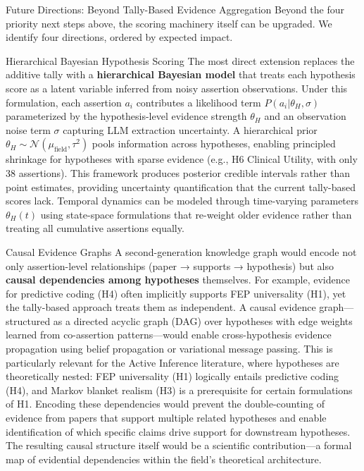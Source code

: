 \documentclass[
  ignorenonframetext,
]{beamer}
\begin{document}
\begin{frame}[allowframebreaks]{Future Directions: Beyond Tally-Based
Evidence Aggregation}
\protect{}\label{future-directions-beyond-tally-based-evidence-aggregation}
Beyond the four priority next steps above, the scoring machinery itself
can be upgraded. We identify four directions, ordered by expected
impact.

\begin{block}{Hierarchical Bayesian Hypothesis Scoring}
\protect{}\label{hierarchical-bayesian-hypothesis-scoring}
The most direct extension replaces the additive tally with a
\textbf{hierarchical Bayesian model} that treats each hypothesis score
as a latent variable inferred from noisy assertion observations. Under
this formulation, each assertion \(a_i\) contributes a likelihood term
\(P(a_i | \theta_H, \sigma)\) parameterized by the hypothesis-level
evidence strength \(\theta_H\) and an observation noise term \(\sigma\)
capturing LLM extraction uncertainty. A hierarchical prior
\(\theta_H \sim \mathcal{N}(\mu_{\text{field}}, \tau^2)\) pools
information across hypotheses, enabling principled shrinkage for
hypotheses with sparse evidence (e.g., H6 Clinical Utility, with only 38
assertions). This framework produces posterior credible intervals rather
than point estimates, providing uncertainty quantification that the
current tally-based scores lack. Temporal dynamics can be modeled
through time-varying parameters \(\theta_H(t)\) using state-space
formulations that re-weight older evidence rather than treating all
cumulative assertions equally.
\end{block}

\begin{block}{Causal Evidence Graphs}
\protect{}\label{causal-evidence-graphs}
A second-generation knowledge graph would encode not only
assertion-level relationships (paper → supports → hypothesis) but also
\textbf{causal dependencies among hypotheses} themselves. For example,
evidence for predictive coding (H4) often implicitly supports FEP
universality (H1), yet the tally-based approach treats them as
independent. A causal evidence graph---structured as a directed acyclic
graph (DAG) over hypotheses with edge weights learned from co-assertion
patterns---would enable cross-hypothesis evidence propagation using
belief propagation or variational message passing. This is particularly
relevant for the Active Inference literature, where hypotheses are
theoretically nested: FEP universality (H1) logically entails predictive
coding (H4), and Markov blanket realism (H3) is a prerequisite for
certain formulations of H1. Encoding these dependencies would prevent
the double-counting of evidence from papers that support multiple
related hypotheses and enable identification of which specific claims
drive support for downstream hypotheses. The resulting causal structure
itself would be a scientific contribution---a formal map of evidential
dependencies within the field's theoretical architecture.
\end{block}


\end{frame}
\end{document}
